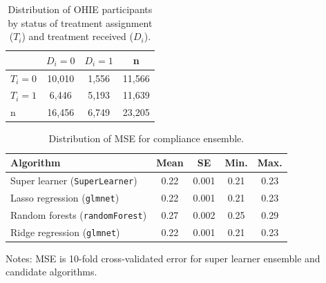 \documentclass[hidelinks,12pt]{article}
\begin{document}
{\begin{appendices}
\begin{table}[h]
	\begin{center}
	\caption{Distribution of OHIE participants by status of treatment assignment ($T_i$) and treatment received ($D_i$).\label{ohie-status}} 
	\begin{tabular}{@{}lccc@{}}
		\toprule
		& $D_i = 0$ & $D_i = 1$ & n      \\ \midrule
		$T_i = 0$ & 10,010    & 1,556     & 11,566 \\
		$T_i = 1$ & 6,446     & 5,193     & 11,639 \\
		n         & 16,456    & 6,749     & 23,205 \\ \bottomrule
	\end{tabular}
	\end{center}
\end{table}

\begin{table}[h]
\begin{center}
\caption{Distribution of MSE for compliance ensemble.\label{compliance-ensemble}} 
\begin{tabular}{lcccc}
  \hline
 Algorithm & Mean & SE & Min. & Max. \\ 
  \hline
        \rowcolor{Gray}
Super learner (\texttt{SuperLearner}) & 0.22  & 0.001 & 0.21 & 0.23 \\
Lasso regression (\texttt{glmnet})  & 0.22  & 0.001 & 0.21 & 0.23 \\
Random forests (\texttt{randomForest}) & 0.27  & 0.002 & 0.25 & 0.29 \\
Ridge regression (\texttt{glmnet}) & 0.22  & 0.001 & 0.21 & 0.23 \\
   \hline
\end{tabular} 
\end{center}
\footnotesize{{\color{red}Notes: MSE is 10-fold cross-validated error for super learner ensemble and candidate algorithms.}}
\end{table}

\pagebreak



\end{appendices}}
\end{document}
